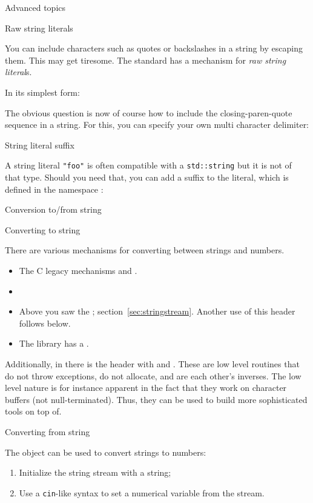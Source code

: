  {Advanced topics}

 {Raw string literals}

You can include characters such as quotes or backslashes in a string
by escaping them. This may get tiresome.
The  standard has a mechanism for 
\emph{raw string literal}s.

In its simplest form:

The obvious question is now of course how to include the
closing-paren-quote sequence in a string.
For this, you can specify your own multi character delimiter:

 {String literal suffix}

A string literal \lstinline+"foo"+ is often compatible with a
\lstinline+std::string+ but it is not of that type.
Should you need that, you can add a suffix to the literal,
which is defined in the namespace :
%

 {Conversion to/from string}

 {Converting to string}

There are various mechanisms for converting between strings and numbers.
\begin{itemize}
\item The C legacy mechanisms  and .
\item  {}
\item Above you saw the ; section~\ref{sec:stringstream}.
  Another use of this header follows below.
\item The  library has a .
\end{itemize}

Additionally, in  there is the
 header with  and
. These are low level routines that do not
throw exceptions, do not allocate, and are each other's inverses. The
low level nature is for instance apparent in the fact that they work
on character buffers (not null-terminated). Thus, they can be used to
build more sophisticated tools on top of.

 {Converting from string}

The  object can be used to convert strings to numbers:
\begin{enumerate}
\item Initialize the string stream with a string;
\item Use a \lstinline{cin}-like syntax to set a numerical variable from the stream.
\end{enumerate}


